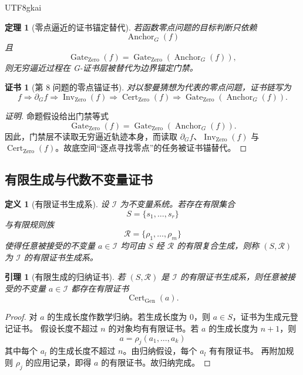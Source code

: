 \documentclass[12pt]{article}
\newtheorem{definition}{定义}[section]
\newtheorem{theorem}{定理}[section]
\newtheorem{lemma}{引理}[section]
\newtheorem{Certificate}{证书}[section]
\newcommand{\Rcal}{\mathcal{R}}
\newcommand{\Ical}{\mathcal{I}}
\DeclareMathOperator{\Cert}{Cert}
\DeclareMathOperator{\Gate}{Gate}
\DeclareMathOperator{\Inv}{Inv}
\DeclareMathOperator{\Gen}{Gen}
\DeclareMathOperator{\Zero}{Zero}
\DeclareMathOperator{\Anchor}{Anchor}
\begin{document}
\begin{CJK*}{UTF8}{gkai}
\begin{theorem}[零点逼近的证书锚定替代]
\label{thm:tex59-zero-anchor}
若函数零点问题的目标判断只依赖
\[
  \Anchor_G(f)
\]
且
\[
  \Gate_{\Zero}(f)
  =
  \Gate_{\Zero}(\Anchor_G(f)),
\]
则无穷逼近过程在 G-证书层被替代为边界锚定门禁。
\end{theorem}

\begin{Certificate}[第 8 问题的零点锚证书]
\label{cert:tex59-riemann-anchor}
对以黎曼猜想为代表的零点问题，证书链写为
\[
  f
  \Longrightarrow
  \partial_G f
  \Longrightarrow
  \Inv_{\Zero}(f)
  \Longrightarrow
  \Cert_{\Zero}(f)
  \Longrightarrow
  \Gate_{\Zero}(\Anchor_G(f)).
\]
\end{Certificate}

\begin{proof}[证明]
命题假设给出门禁等式
\[
  \Gate_{\Zero}(f)
  =
  \Gate_{\Zero}(\Anchor_G(f)).
\]
因此，门禁层不读取无穷逼近轨迹本身，而读取 \(\partial_G f\)、\(\Inv_{\Zero}(f)\) 与
\(\Cert_{\Zero}(f)\)。故底空间“逐点寻找零点”的任务被证书锚替代。
\end{proof}

\subsection{有限生成与代数不变量证书}
\label{subsec:tex59-finite-generation}

\begin{definition}[有限证书生成系]
\label{def:tex59-finite-generation}
设 \(\Ical\) 为不变量系统。若存在有限集合
\[
  S=\{s_1,\ldots,s_r\}
\]
与有限规则族
\[
  \Rcal=\{\rho_1,\ldots,\rho_m\}
\]
使得任意被接受的不变量 \(a\in\Ical\) 均可由 \(S\) 经 \(\Rcal\) 的有限复合生成，则称
\((S,\Rcal)\) 为 \(\Ical\) 的有限证书生成系。
\end{definition}

\begin{lemma}[有限生成的归纳证书]
\label{lem:tex59-finite-generation}
若 \((S,\Rcal)\) 是 \(\Ical\) 的有限证书生成系，则任意被接受的不变量
\(a\in\Ical\) 都存在有限证书
\[
  \Cert_{\Gen}(a).
\]
\end{lemma}

\begin{proof}
对 \(a\) 的生成长度作数学归纳。若生成长度为 \(0\)，则 \(a\in S\)，证书为生成元登记证书。
假设长度不超过 \(n\) 的对象均有有限证书。若 \(a\) 的生成长度为 \(n+1\)，则
\[
  a=\rho_j(a_1,\ldots,a_k)
\]
其中每个 \(a_l\) 的生成长度不超过 \(n\)。由归纳假设，每个 \(a_l\) 有有限证书。
再附加规则 \(\rho_j\) 的应用记录，即得 \(a\) 的有限证书。故归纳完成。
\end{proof}


\end{CJK*}
\end{document}
